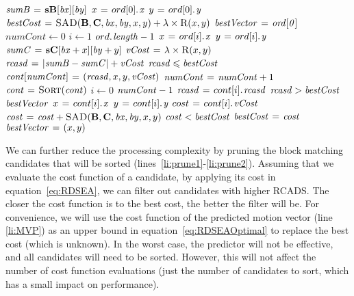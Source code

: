 \documentclass{article}
\begin{document}
\begin{codebox}
\li $\id{sumB} \gets \textbf{sB}[\id{bx}][\id{by}]$ \label{li:tableLookup1}
\li $x \gets \attrib{ord[0]}{x}$
\li $y \gets \attrib{ord[0]}{y}$
\li $\id{bestCost} \gets \proc{SAD}(\textbf{B}, \textbf{C}, \id{bx}, \id{by}, x, y) + \lambda \times \proc{R}(x,y)$ \label{li:MVP}
\li $\id{bestVector} \gets \id{ord[0]}$
\li $numCont \gets 0$
\li \For $i \gets 1$ \To $\attrib{ord}{length} - 1$
\li \Do
      $x \gets \attrib{ord[i]}{x}$
\li   $y \gets \attrib{ord[i]}{y}$
\li   $\id{sumC} \gets \textbf{sC}[\id{bx} + x][\id{by} + y]$ \label{li:tableLookup2}
\li   $\id{vCost} \gets \lambda \times \proc{R}(x,y)$
\li   $\id{rcasd} \gets | \id{sumB} - \id{sumC} | + \id{vCost}$ \label{li:rcads}
\li   \If $\id{rcasd} \leqslant \id{bestCost}$ \label{li:prune1}
\li   \Then
        $\id{cont[\id{numCont}]} \gets (\id{rcasd}, x, y, \id{vCost})$ \label{li:prune2}
\li     $\id{numCont} \gets \id{numCont} + 1$
      \End
    \End
\li $\id{cont} \gets \proc{Sort}(\id{cont})$ \label{li:Sort}
\li \For $i \gets 0$ \To $\id{numCont} - 1$
\li \Do
      $\id{rcasd} \gets \attrib{cont[i]}{rcasd}$
\li   \If $\id{rcasd} > \id{bestCost}$ \label{li:Threshold1}
\li   \Then
        \Return $\id{bestVector}$ \label{li:Threshold2}
\li   \Else
\li
        $x \gets \attrib{cont[i]}{x}$
\li     $y \gets \attrib{cont[i]}{y}$
\li     $cost \gets \attrib{cont[i]}{vCost}$
\li     $\id{cost} \gets \id{cost} + \proc{SAD}(\textbf{B}, \textbf{C}, \id{bx}, \id{by}, x, y)$
\li     \If $\id{cost} < \id{bestCost}$
\li     \Then
          $\id{bestCost} \gets \id{cost}$
\li       $\id{bestVector} \gets (x,y)$
        \End
      \End
    \End
\end{codebox}

We can further reduce the processing complexity by pruning the block matching candidates that will be sorted (lines~\ref{li:prune1}-\ref{li:prune2}). Assuming that we evaluate the cost function of a candidate, by applying its cost in equation~\ref{eq:RDSEA}, we can filter out candidates with higher RCADS. The closer the cost function is to the best cost, the better the filter will be. For convenience, we will use the cost function of the predicted motion vector (line \ref{li:MVP}) as an upper bound in equation~\ref{eq:RDSEAOptimal} to replace the best cost (which is unknown). In the worst case, the predictor will not be effective, and all candidates will need to be sorted. However, this will not affect the number of cost function evaluations (just the number of candidates to sort, which has a small impact on performance).
\end{document}
